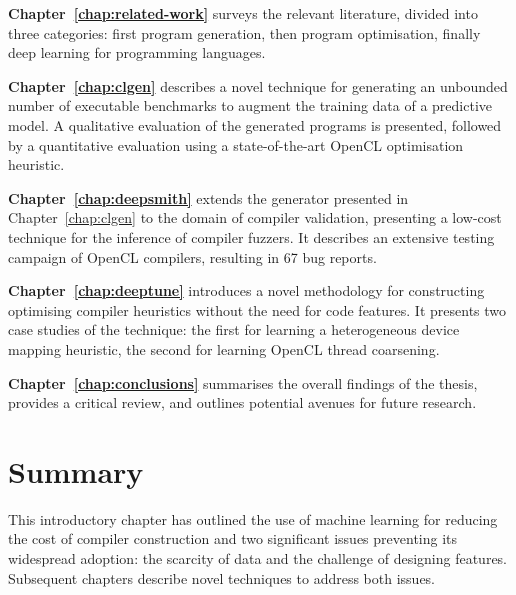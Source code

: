 \textbf{Chapter~\ref{chap:related-work}} surveys the relevant literature, divided into three categories: first program generation, then program optimisation, finally deep learning for programming languages.

\textbf{Chapter~\ref{chap:clgen}} describes a novel technique for generating an unbounded number of executable benchmarks to augment the training data of a predictive model. A qualitative evaluation of the generated programs is presented, followed by a quantitative evaluation using a state-of-the-art OpenCL optimisation heuristic.

\textbf{Chapter~\ref{chap:deepsmith}} extends the generator presented in Chapter~\ref{chap:clgen} to the domain of compiler validation, presenting a low-cost technique for the inference of compiler fuzzers. It describes an extensive testing campaign of OpenCL compilers, resulting in 67 bug reports.

\textbf{Chapter~\ref{chap:deeptune}} introduces a novel methodology for constructing optimising compiler heuristics without the need for code features. It presents two case studies of the technique: the first for learning a heterogeneous device mapping heuristic, the second for learning OpenCL thread coarsening.

\textbf{Chapter~\ref{chap:conclusions}} summarises the overall findings of the thesis, provides a critical review, and outlines potential avenues for future research.


\section{Summary}

This introductory chapter has outlined the use of machine learning for reducing the cost of compiler construction and two significant issues preventing its widespread adoption: the scarcity of data and the challenge of designing features. Subsequent chapters describe novel techniques to address both issues.
